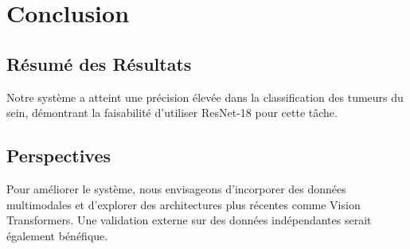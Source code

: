 \documentclass[a4paper,12pt]{article}
\begin{document}
\section{Conclusion}

\subsection{Résumé des Résultats}
Notre système a atteint une précision élevée dans la classification des tumeurs du sein, démontrant la faisabilité d'utiliser ResNet-18 pour cette tâche.

\subsection{Perspectives}
Pour améliorer le système, nous envisageons d'incorporer des données multimodales et d'explorer des architectures plus récentes comme Vision Transformers. Une validation externe sur des données indépendantes serait également bénéfique.

\clearpage


\end{document}
